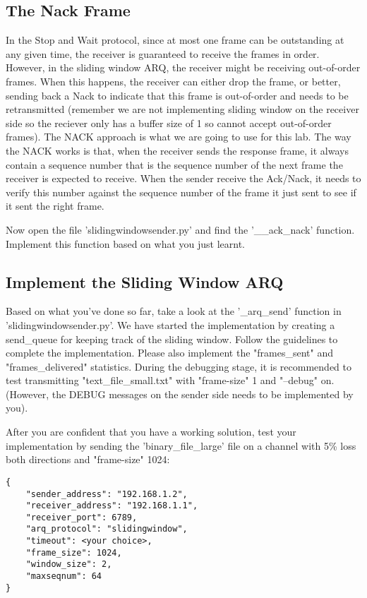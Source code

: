 \documentclass[11pt]{article}
\begin{document}
\subsection{The Nack Frame}
In the Stop and Wait protocol, since at most one frame can be outstanding at any given time, the receiver is guaranteed to receive the frames in order. However, in the sliding window ARQ, the receiver might be receiving out-of-order frames. When this happens, the receiver can either drop the frame, or better, sending back a Nack to indicate that this frame is out-of-order and needs to be retransmitted (remember we are not implementing sliding window on the receiver side so the reciever only has a buffer size of 1 so cannot accept out-of-order frames). The NACK approach is what we are going to use for this lab. The way the NACK works is that, when the receiver sends the response frame, it always contain a sequence number that is the sequence number of the next frame the receiver is expected to receive. When the sender receive the Ack/Nack, it needs to verify this number against the sequence number of the frame it just sent to see if it sent the right frame.

\noindent Now open the file 'slidingwindowsender.py' and find the '\_\_ack\_nack' function. Implement this function based on what you just learnt.

\subsection{Implement the Sliding Window ARQ}
Based on what you've done so far, take a look at the '\_arq\_send' function in 'slidingwindowsender.py'. We have started the implementation by creating a send\_queue for keeping track of the sliding window. Follow the guidelines to complete the implementation. Please also implement the "frames\_sent" and "frames\_delivered" statistics. During the debugging stage, it is recommended to test transmitting "text\_file\_small.txt" with "frame-size" 1 and "--debug" on. (However, the DEBUG messages on the sender side needs to be implemented by you). 


\noindent After you are confident that you have a working solution, test your implementation by sending the 'binary\_file\_large' file on a channel with 5\% loss both directions and "frame-size" 1024:
\begin{lstlisting}[caption={Sliding Window Configuration}]
{
    "sender_address": "192.168.1.2",
    "receiver_address": "192.168.1.1",
    "receiver_port": 6789,
    "arq_protocol": "slidingwindow",
    "timeout": <your choice>,
    "frame_size": 1024,
    "window_size": 2,
    "maxseqnum": 64
}
\end{lstlisting}
\end{document}
